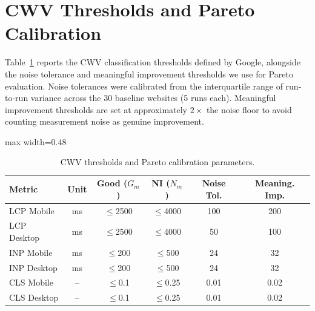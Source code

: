


\section{CWV Thresholds and Pareto Calibration}
\label{sec:eval-metrics}

Table~\ref{tab:thresholds-full} reports the CWV classification thresholds defined by Google, alongside the noise tolerance and meaningful improvement thresholds we use for Pareto evaluation. Noise tolerances were calibrated from the interquartile range of run-to-run variance across the 30 baseline websites (5 runs each). Meaningful improvement thresholds are set at approximately $2\times$ the noise floor to avoid counting measurement noise as genuine improvement.

\begin{table}[h]
\centering
\small
\caption{CWV thresholds and Pareto calibration parameters.}
\label{tab:thresholds-full}
\begin{adjustbox}{max width=0.48\textwidth}
\begin{tabular}{lccccc}
\toprule
\textbf{Metric} & \textbf{Unit} & \textbf{Good ($G_m$)} & \textbf{NI ($N_m$)} & \textbf{Noise Tol.} & \textbf{Meaning. Imp.} \\
\midrule
LCP Mobile  & ms & $\leq$2500 & $\leq$4000 & 100 & 200 \\
LCP Desktop & ms & $\leq$2500 & $\leq$4000 & 50  & 100 \\
INP Mobile  & ms & $\leq$200  & $\leq$500  & 24  & 32  \\
INP Desktop & ms & $\leq$200  & $\leq$500  & 24  & 32  \\
CLS Mobile  & -- & $\leq$0.1  & $\leq$0.25 & 0.01 & 0.02 \\
CLS Desktop & -- & $\leq$0.1  & $\leq$0.25 & 0.01 & 0.02 \\
\bottomrule
\end{tabular}
\end{adjustbox}
\end{table}

